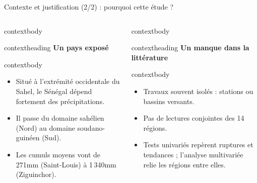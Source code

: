\documentclass[aspectratio=169,11pt]{beamer}
\begin{document}
\begin{frame}{Contexte et justification (2/2) : pourquoi cette étude ?}
  \begin{columns}[T,onlytextwidth]
      \begin{beamercolorbox}[wd=\linewidth,rounded=true,sep=0pt]{contextbody}
        \begin{beamercolorbox}[wd=\linewidth,ht=0.40cm,dp=0.08cm,leftskip=0.16cm]{contextheading}
          \bfseries Un pays exposé
        \end{beamercolorbox}
        \begin{beamercolorbox}[wd=\linewidth,sep=0.08cm]{contextbody}
          \footnotesize
          \begin{itemize}
            \setlength\itemsep{0.04cm}
            \item Situé à l’extrémité occidentale du Sahel, le Sénégal dépend fortement des précipitations.
            \item Il passe du domaine sahélien (Nord) au domaine soudano-guinéen (Sud).
            \item Les cumuls moyens vont de 271mm (Saint-Louis) à 1\,340mm (Ziguinchor).
          \end{itemize}
        \end{beamercolorbox}
      \end{beamercolorbox}
      \vspace{0cm}
      \begin{beamercolorbox}[wd=\linewidth,rounded=true,sep=0pt]{contextbody}
        \begin{beamercolorbox}[wd=\linewidth,ht=0.40cm,dp=0.08cm,leftskip=0.16cm]{contextheading}
          \bfseries Un manque dans la littérature
        \end{beamercolorbox}
        \begin{beamercolorbox}[wd=\linewidth,sep=0.01cm]{contextbody}
          \footnotesize
          \begin{itemize}
            \setlength\itemsep{0cm}
            \setlength\topsep{0pt}
            \setlength\parsep{0pt}
            \item Travaux souvent isolés : stations ou bassins versants.
            \item Pas de lectures conjointes des 14 régions.
            \item Tests univariés repèrent ruptures et tendances ; l’analyse multivariée relie les régions entre elles.
          \end{itemize}

\end{beamercolorbox}
\end{beamercolorbox}
\end{columns}
\end{frame}
\end{document}
